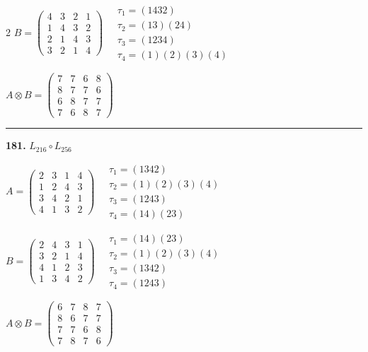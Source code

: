 \begin{multicols}{2}
$B = \begin{pmatrix} 4 & 3 & 2 & 1 \\ 1 & 4 & 3 & 2 \\ 2 & 1 & 4 & 3 \\ 3 & 2 & 1 & 4 \end{pmatrix} \quad \begin{matrix} \tau_{1}=(1 4 3 2) \\ \tau_{2}=(1 3)(2 4) \\ \tau_{3}=(1 2 3 4) \\ \tau_{4}=(1)(2)(3)(4) \end{matrix}$

$A \otimes B = \begin{pmatrix} 7 & 7 & 6 & 8 \\ 8 & 7 & 7 & 6 \\ 6 & 8 & 7 & 7 \\ 7 & 6 & 8 & 7 \end{pmatrix}$

\vspace{0.3em}
\hrule
\vspace{0.3em}

\noindent\textbf{181.} $L_{216} \circ L_{256}$

$A = \begin{pmatrix} 2 & 3 & 1 & 4 \\ 1 & 2 & 4 & 3 \\ 3 & 4 & 2 & 1 \\ 4 & 1 & 3 & 2 \end{pmatrix} \quad \begin{matrix} \tau_{1}=(1 3 4 2) \\ \tau_{2}=(1)(2)(3)(4) \\ \tau_{3}=(1 2 4 3) \\ \tau_{4}=(1 4)(2 3) \end{matrix}$

$B = \begin{pmatrix} 2 & 4 & 3 & 1 \\ 3 & 2 & 1 & 4 \\ 4 & 1 & 2 & 3 \\ 1 & 3 & 4 & 2 \end{pmatrix} \quad \begin{matrix} \tau_{1}=(1 4)(2 3) \\ \tau_{2}=(1)(2)(3)(4) \\ \tau_{3}=(1 3 4 2) \\ \tau_{4}=(1 2 4 3) \end{matrix}$

$A \otimes B = \begin{pmatrix} 6 & 7 & 8 & 7 \\ 8 & 6 & 7 & 7 \\ 7 & 7 & 6 & 8 \\ 7 & 8 & 7 & 6 \end{pmatrix}$


\end{multicols}

